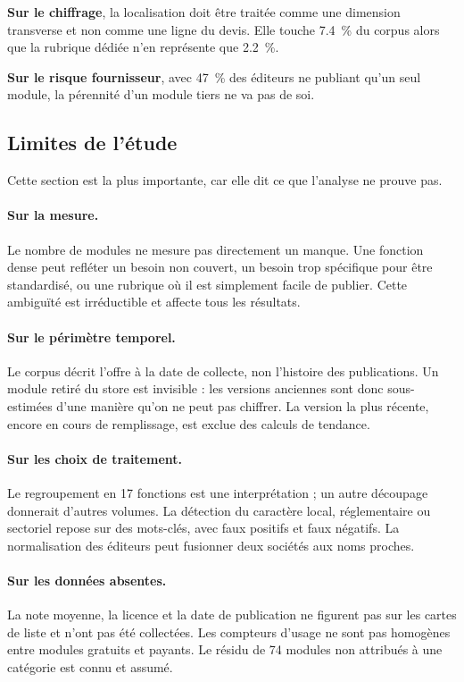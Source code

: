 \documentclass[11pt,a4paper]{article}
\begin{document}
\textbf{Sur le chiffrage}, la localisation doit être traitée comme une dimension
transverse et non comme une ligne du devis. Elle touche \SI{7.4}{\percent} du
corpus alors que la rubrique dédiée n'en représente que \SI{2.2}{\percent}.

\textbf{Sur le risque fournisseur}, avec \SI{47}{\percent} des éditeurs ne
publiant qu'un seul module, la pérennité d'un module tiers ne va pas de soi.

\subsection{Limites de l'étude}

Cette section est la plus importante, car elle dit ce que l'analyse ne prouve
pas.

\paragraph{Sur la mesure.} Le nombre de modules ne mesure pas directement un
manque. Une fonction dense peut refléter un besoin non couvert, un besoin trop
spécifique pour être standardisé, ou une rubrique où il est simplement facile de
publier. Cette ambiguïté est irréductible et affecte tous les résultats.

\paragraph{Sur le périmètre temporel.} Le corpus décrit l'offre à la date de
collecte, non l'histoire des publications. Un module retiré du store est
invisible : les versions anciennes sont donc sous-estimées d'une manière qu'on
ne peut pas chiffrer. La version la plus récente, encore en cours de
remplissage, est exclue des calculs de tendance.

\paragraph{Sur les choix de traitement.} Le regroupement en \num{17} fonctions
est une interprétation ; un autre découpage donnerait d'autres volumes. La
détection du caractère local, réglementaire ou sectoriel repose sur des
mots-clés, avec faux positifs et faux négatifs. La normalisation des éditeurs
peut fusionner deux sociétés aux noms proches.

\paragraph{Sur les données absentes.} La note moyenne, la licence et la date de
publication ne figurent pas sur les cartes de liste et n'ont pas été collectées.
Les compteurs d'usage ne sont pas homogènes entre modules gratuits et payants.
Le résidu de \num{74} modules non attribués à une catégorie est connu et assumé.
\end{document}
